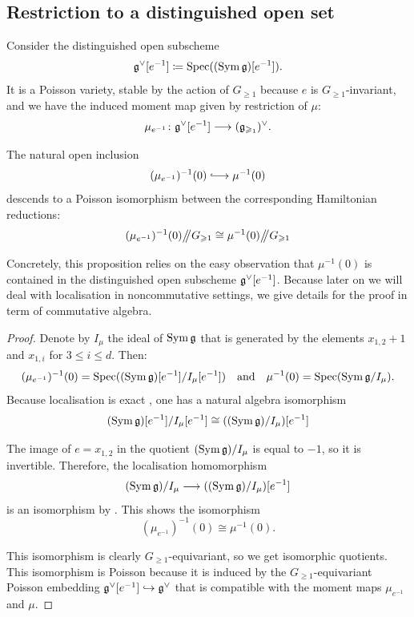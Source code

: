 \subsection{Restriction to a distinguished open set}

Consider the distinguished open subscheme
\[ \mathfrak g^\vee[e^{-1}] \coloneqq \operatorname{Spec} ((\operatorname{Sym} \mathfrak g)[e^{-1}]). \]
It is a Poisson variety, stable by the action of $G_{\geqslant 1}$ because $e$ is $G_{\geqslant 1}$-invariant, and we have the induced moment map given by restriction of $\mu$:
\[ \mu_{e^{-1}} \colon \mathfrak g^\vee[e^{-1}] \longrightarrow (\mathfrak g_{\geqslant_1})^\vee. \]

\begin{proposition} \label{proposition:hamiltonian-reduction-open}
	The natural open inclusion 
	\[ (\mu_{e^{-1}})^{-1}(0) \hooklongrightarrow \mu^{-1}(0) \]
	descends to a Poisson isomorphism between the corresponding Hamiltonian reductions:
	\[ (\mu_{e^{-1}})^{-1}(0) \big/\!\!\big/ G_{\geqslant 1} \cong \mu^{-1}(0) \big/\!\!\big/ G_{\geqslant 1} \]
	
\end{proposition}

Concretely, this proposition relies on the easy observation that $\mu^{-1}(0)$ is contained in the distinguished open subscheme $\mathfrak g^\vee[e^{-1}]$. Because later on we will deal with localisation in noncommutative settings, we give details for the proof in term of commutative algebra.

\begin{proof}
	Denote by $I_{\mu}$ the ideal of $\operatorname{Sym} \mathfrak g$ that is generated by the elements $x_{1,2} + 1$ and $x_{1,i}$ for $3 \leqslant i \leqslant d$. Then:
	\[ (\mu_{e^{-1}})^{-1}(0) = \operatorname{Spec} ((\operatorname{Sym}\mathfrak g) [e^{-1}] / I_{\mu} [e^{-1}]) \quad \text{and} \quad \mu^{-1}(0) = \operatorname{Spec} (\operatorname{Sym}\mathfrak g / I_{\mu}). \]
	Because localisation is exact \cite[Proposition 2.5]{eisenbud1995commutative}, one has a natural algebra isomorphism
	\[ (\operatorname{Sym}\mathfrak g) [e^{-1}] / I_{\mu} [e^{-1}] \cong ((\operatorname{Sym}\mathfrak g) / I_{\mu}) [e^{-1}] \]
	
	
	The image of $e = x_{1,2}$ in the quotient $(\operatorname{Sym}\mathfrak g) / I_{\mu}$ is equal to $-1$, so it is invertible. Therefore, the localisation homomorphism
	\[ (\operatorname{Sym}\mathfrak g) / I_{\mu} \longrightarrow ((\operatorname{Sym}\mathfrak g) / I_{\mu}) [e^{-1}] \]
	is an isomorphism by \cite[Exercise 2.9]{eisenbud1995commutative}. This shows the isomorphism
	\[ (\mu_{e^{-1}})^{-1}(0) \cong \mu^{-1}(0). \]
	
	This isomorphism is clearly $G_{\geqslant 1}$-equivariant, so we get isomorphic quotients. This isomorphism is Poisson because it is induced by the $G_{\geqslant 1}$-equivariant Poisson embedding $\mathfrak g^\vee[e^{-1}] \hookrightarrow \mathfrak g^\vee$ that is compatible with the moment maps $\mu_{e^{-1}}$ and $\mu$.
\end{proof}


